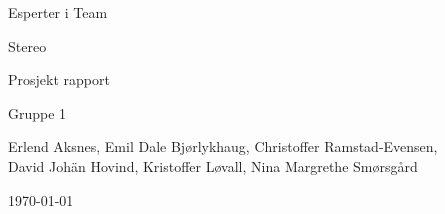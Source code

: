 \begin{titlepage}
\begin{center}
\vspace*{1in}
{\LARGE Esperter i Team}
\par
\vspace{1cm}


\begin{figure}[ht!]
\centering
\label{overflow}
\end{figure}


{\LARGE Stereo}
\par
\vspace{0.6in}
{\LARGE Prosjekt rapport}
\par
\vspace{0.2in}
{\Large Gruppe 1}
\par
\vfill
\par
\vspace{0.5in}
Erlend Aksnes, Emil Dale Bjørlykhaug, Christoffer Ramstad-Evensen, \\David Johän Hovind, Kristoffer Løvall, Nina Margrethe Smørsgård
\par
\vspace{0.4cm}
\today
\end{center}
\end{titlepage}
